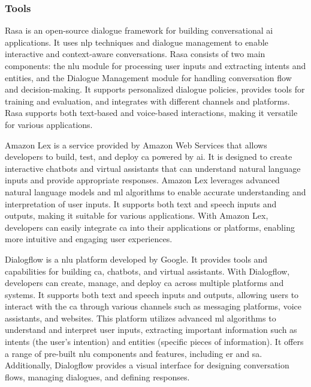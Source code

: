 \documentclass[a4paper,fleqn]{cas-sc}
\begin{document}
\subsubsection{Tools}

Rasa \cite{rasa} is an open-source dialogue framework for building conversational \gls{ai} applications. It uses \gls{nlp} techniques and dialogue management to enable interactive and context-aware conversations. Rasa consists of two main components: the \gls{nlu} module for processing user inputs and extracting intents and entities, and the Dialogue Management module for handling conversation flow and decision-making. It supports personalized dialogue policies, provides tools for training and evaluation, and integrates with different channels and platforms. Rasa supports both text-based and voice-based interactions, making it versatile for various applications.

Amazon Lex \cite{aws} is a service provided by Amazon Web Services that allows developers to build, test, and deploy \gls{ca} powered by \gls{ai}. It is designed to create interactive chatbots and virtual assistants that can understand natural language inputs and provide appropriate responses. Amazon Lex leverages advanced natural language models and \gls{ml} algorithms to enable accurate understanding and interpretation of user inputs. It supports both text and speech inputs and outputs, making it suitable for various applications. With Amazon Lex, developers can easily integrate \gls{ca} into their applications or platforms, enabling more intuitive and engaging user experiences.

Dialogflow \cite{dialogflow} is a \gls{nlu} platform developed by Google. It provides tools and capabilities for building \gls{ca}, chatbots, and virtual assistants. With Dialogflow, developers can create, manage, and deploy \gls{ca} across multiple platforms and systems. It supports both text and speech inputs and outputs, allowing users to interact with the \gls{ca} through various channels such as messaging platforms, voice assistants, and websites. This platform utilizes advanced \gls{ml} algorithms to understand and interpret user inputs, extracting important information such as intents (the user's intention) and entities (specific pieces of information). It offers a range of pre-built \gls{nlu} components and features, including \gls{er} and \gls{sa}. Additionally, Dialogflow provides a visual interface for designing conversation flows, managing dialogues, and defining responses.
\end{document}
